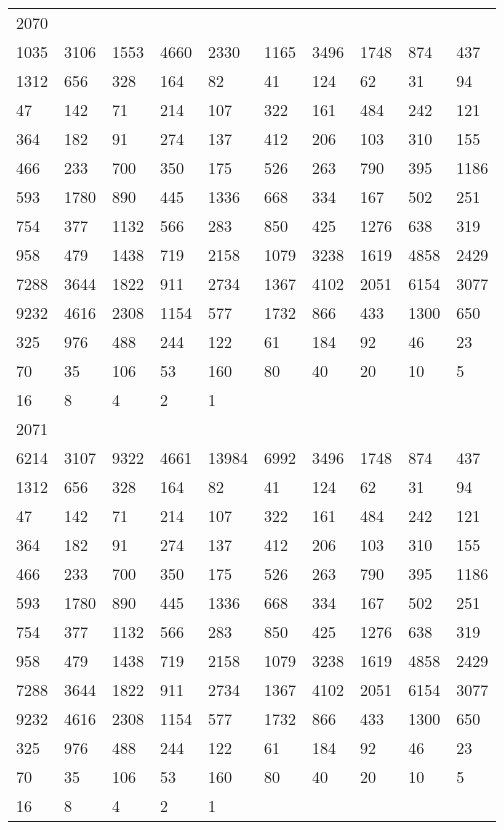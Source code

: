 \begin{longtable}{*{10}{l}}
2070&&&&&&&&&\\
1035& 3106& 1553& 4660& 2330& 1165& 3496& 1748& 874& 437\\
1312& 656& 328& 164& 82& 41& 124& 62& 31& 94\\
47& 142& 71& 214& 107& 322& 161& 484& 242& 121\\
364& 182& 91& 274& 137& 412& 206& 103& 310& 155\\
466& 233& 700& 350& 175& 526& 263& 790& 395& 1186\\
593& 1780& 890& 445& 1336& 668& 334& 167& 502& 251\\
754& 377& 1132& 566& 283& 850& 425& 1276& 638& 319\\
958& 479& 1438& 719& 2158& 1079& 3238& 1619& 4858& 2429\\
7288& 3644& 1822& 911& 2734& 1367& 4102& 2051& 6154& 3077\\
9232& 4616& 2308& 1154& 577& 1732& 866& 433& 1300& 650\\
325& 976& 488& 244& 122& 61& 184& 92& 46& 23\\
70& 35& 106& 53& 160& 80& 40& 20& 10& 5\\
16& 8& 4& 2& 1& \\

2071&&&&&&&&&\\
6214& 3107& 9322& 4661& 13984& 6992& 3496& 1748& 874& 437\\
1312& 656& 328& 164& 82& 41& 124& 62& 31& 94\\
47& 142& 71& 214& 107& 322& 161& 484& 242& 121\\
364& 182& 91& 274& 137& 412& 206& 103& 310& 155\\
466& 233& 700& 350& 175& 526& 263& 790& 395& 1186\\
593& 1780& 890& 445& 1336& 668& 334& 167& 502& 251\\
754& 377& 1132& 566& 283& 850& 425& 1276& 638& 319\\
958& 479& 1438& 719& 2158& 1079& 3238& 1619& 4858& 2429\\
7288& 3644& 1822& 911& 2734& 1367& 4102& 2051& 6154& 3077\\
9232& 4616& 2308& 1154& 577& 1732& 866& 433& 1300& 650\\
325& 976& 488& 244& 122& 61& 184& 92& 46& 23\\
70& 35& 106& 53& 160& 80& 40& 20& 10& 5\\
16& 8& 4& 2& 1& \\


\end{longtable}

